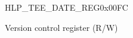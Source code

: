 \begin{register}{H}{LP\_TEE\_DATE\_REG}{0x00FC}\label{regdesc:LPTEEDATEREG}
%
%
\regnewline%
\begin{regdesc}\begin{reglist}
\label{fielddesc:LPTEEDATEREG}\item [LP\_TEE\_DATE] Version control register (R/W)
\end{reglist}\end{regdesc}
\end{register}
